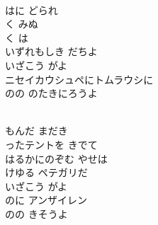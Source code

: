 \documentclass[10pt,b5j]{tarticle} %
\begin{document}
\begin{enumerate}
\begin{minipage}[c]{\blocksize}
        \vspace{\linespace}
        \item~\\
        はに どられ\\
        く みぬ\\
        く は\\
        いずれもしき だちよ\\
        いざこう がよ\\
        ニセイカウシュペにトムラウシに\\
        のの
        のたきにろうよ
        
        \vspace{\linespace}
        \item~\\
        もんだ まだき\\
        ったテントを きでて\\
        はるかにのぞむ やせは\\
        けゆる ペテガリだ\\
        いざこう がよ\\
        のに アンザイレン\\
        のの
        きそうよ
    
    \end{minipage}
\end{enumerate} %
\end{document}
